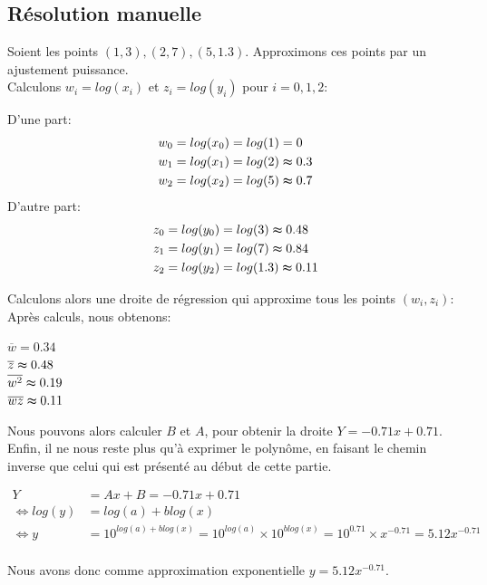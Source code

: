 \subsection{Résolution manuelle}
Soient les points $(1,3), (2,7), (5, 1.3)$. Approximons ces points par un ajustement puissance.\\
Calculons $w_i=log(x_i)$ et $z_i=log(y_i)$ pour $i=0,1,2$:\\
\begin{center}
    D'une part: 
    \begin{align*}
        w_0&=log(x_0)=log(1)=0\\
        w_1&=log(x_1)=log(2)\thickapprox0.3\\
        w_2&=log(x_2)=log(5)\thickapprox 0.7\vspace{2pt}\\
    \end{align*}
    D'autre part: 
    \begin{align*}
        z_0&=log(y_0)=log(3)\thickapprox0.48\\
        z_1&=log(y_1)=log(7)\thickapprox0.84\\
        z_2&=log(y_2)=log(1.3)\thickapprox 0.11\vspace{2pt}\\
    \end{align*}
\end{center}
Calculons alors une droite de régression qui approxime tous les points $(w_i, z_i)$:\\
Après calculs, nous obtenons: \\
\begin{center}
    $\overline{w}=0.34$\vspace{3pt}\\
    $\overline{z}\thickapprox0.48$\vspace{3pt}\\
    $\overline{w^2}\thickapprox0.19$\vspace{3pt}\\
    $\overline{wz}\thickapprox0.11$\vspace{3pt}\\
\end{center}
Nous pouvons alors calculer $B$ et $A$, pour obtenir la droite $Y=-0.71x+0.71$.
Enfin, il ne nous reste plus qu'à exprimer le polynôme, en faisant le chemin inverse que celui qui est présenté au début de cette partie.\\
\begin{center}
    \begin{align*}
        Y&=Ax+B=-0.71x+0.71\\
        \Leftrightarrow log(y)&=log(a)+blog(x)\\
        \Leftrightarrow y&=10^{log(a)+blog(x)}=10^{log(a)}\times 10^{blog(x)}=10^{0.71}\times x^{-0.71}=5.12x^{-0.71}\\
    \end{align*}
\end{center}
Nous avons donc comme approximation exponentielle $y=5.12x^{-0.71}$.
\newpage
